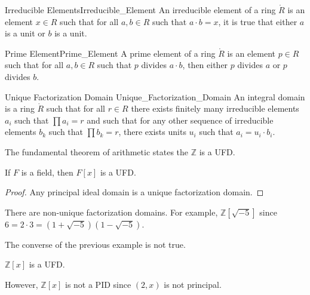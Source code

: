     \begin{fdefinition}{Irreducible Elements}{Irreducible_Element}
        An irreducible element of a ring $\ring{R}$ is an element
        $x\in{R}$ such that for all $a,b\in{R}$ such that $a\cdot{b}=x$, it
        is true that either $a$ is a unit or $b$ is a unit.
    \end{fdefinition}
    \begin{fdefinition}{Prime Element}{Prime_Element}
        A prime element of a ring $\ring{R}$ is an element $p\in{R}$
        such that for all $a,b\in{R}$ such that $p$ divides $a\cdot{b}$,
        then either $p$ divides $a$ or $p$ divides $b$.
    \end{fdefinition}
    \begin{fdefinition}{Unique Factorization Domain}
                       {Unique_Factorization_Domain}
        An integral domain is a ring $\ring{R}$ such that for all $r\in{R}$
        there exists finitely many irreducible elements $a_{i}$ such that
        $\prod{a}_{i}=r$ and such that for any other sequence of irreducible
        elements $b_{k}$ such that $\prod{b}_{k}=r$, there exists units
        $u_{i}$ such that $a_{i}=u_{i}\cdot{b}_{i}$.
    \end{fdefinition}
    \begin{example}
        The fundamental theorem of arithmetic states the $\mathbb{Z}$ is a
        UFD.
    \end{example}
    \begin{theorem}
        If $F$ is a field, then $F[x]$ is a UFD.
    \end{theorem}
    \begin{proof}
        Any principal ideal domain is a unique factorization domain.
    \end{proof}
    \begin{example}
        There are non-unique factorization domains. For example,
        $\mathbb{Z}[\sqrt{\minus{5}}]$ since
        $6=2\cdot{3}=(1+\sqrt{\minus{5}})(1-\sqrt{\minus{5}})$.
    \end{example}
    The converse of the previous example is not true.
    \begin{theorem}
        $\mathbb{Z}[x]$ is a UFD.
    \end{theorem}
    However, $\mathbb{Z}[x]$ is not a PID since $(2,x)$ is not principal.
